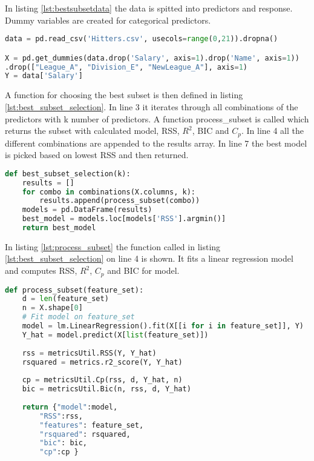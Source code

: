 In listing \ref{lst:bestsubsetdata} the data is spitted into predictors and response. Dummy variables are created for categorical predictors.

\begin{lstlisting}[language=Python, label=lst:bestsubsetdata, caption=Data is splitet into predictors and response]
data = pd.read_csv('Hitters.csv', usecols=range(0,21)).dropna()

X = pd.get_dummies(data.drop('Salary', axis=1).drop('Name', axis=1))
.drop(["League_A", "Division_E", "NewLeague_A"], axis=1)
Y = data['Salary']
\end{lstlisting}


A function for choosing the best subset is then defined in listing \ref{lst:best_subset_selection}. In line 3 it iterates through all combinations of the predictors with k number of predictors. A function process\_subset is called which returns the subset with calculated model, RSS, $R^2$, BIC and $C_p$. In line 4 all the different combinations are appended to the results array. In line 7 the best model is picked based on lowest RSS and then returned.

\begin{lstlisting}[language=Python, label=lst:best_subset_selection, caption=function for choosing best subset]
def best_subset_selection(k):
	results = []
	for combo in combinations(X.columns, k):
		results.append(process_subset(combo))
	models = pd.DataFrame(results)
	best_model = models.loc[models['RSS'].argmin()]
	return best_model
\end{lstlisting}

In listing \ref{lst:process_subset} the function called in listing \ref{lst:best_subset_selection} on line 4 is shown. It fits a linear regression model and computes RSS, $R^2$, $C_p$ and BIC for model.

\begin{lstlisting}[language=Python, label=lst:process_subset, caption=Calculating metrics for subset]
def process_subset(feature_set):
	d = len(feature_set)
	n = X.shape[0]
	# Fit model on feature_set  
	model = lm.LinearRegression().fit(X[[i for i in feature_set]], Y)
	Y_hat = model.predict(X[list(feature_set)])
	
	rss = metricsUtil.RSS(Y, Y_hat)  
	rsquared = metrics.r2_score(Y, Y_hat)
	
	cp = metricsUtil.Cp(rss, d, Y_hat, n)
	bic = metricsUtil.Bic(n, rss, d, Y_hat)
	
	return {"model":model, 
		"RSS":rss,
		"features": feature_set,
		"rsquared": rsquared,
		"bic": bic,
		"cp":cp }
\end{lstlisting}

